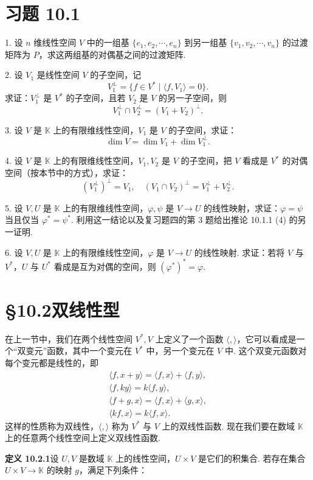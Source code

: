 \documentclass[UTF8,12pt,a4paper,fontset=fandol]{ctexart}
\begin{document}
\section*{习题 10.1}

1. 设 $n$ 维线性空间 $V$ 中的一组基 $\{e_1,e_2,\cdots,e_n\}$ 到另一组基 $\{v_1,v_2,\cdots,v_n\}$ 的过渡矩阵为 $P$，求这两组基的对偶基之间的过渡矩阵.

2. 设 $V_1$ 是线性空间 $V$ 的子空间，记
\[
  V_1^\perp=\{f\in V^*\mid \langle f,V_1\rangle=0\}.
\]
求证：$V_1^\perp$ 是 $V^*$ 的子空间，且若 $V_2$ 是 $V$ 的另一子空间，则
\[
  V_1^\perp\cap V_2^\perp=(V_1+V_2)^\perp.
\]

3. 设 $V$ 是 $\mathbb K$ 上的有限维线性空间，$V_1$ 是 $V$ 的子空间，求证：
\[
  \dim V=\dim V_1+\dim V_1^\perp.
\]

4. 设 $V$ 是 $\mathbb K$ 上的有限维线性空间，$V_1,V_2$ 是 $V$ 的子空间，把 $V$ 看成是 $V^*$ 的对偶空间（按本节中的方式），求证：
\[
  (V_1^\perp)^\perp=V_1,\quad (V_1\cap V_2)^\perp=V_1^\perp+V_2^\perp.
\]

5. 设 $V,U$ 是 $\mathbb K$ 上的有限维线性空间，$\varphi,\psi$ 是 $V\to U$ 的线性映射，求证：$\varphi=\psi$ 当且仅当 $\varphi^*=\psi^*$. 利用这一结论以及复习题四的第 3 题给出推论 10.1.1 (4) 的另一证明.

6. 设 $V,U$ 是 $\mathbb K$ 上的有限维线性空间，$\varphi$ 是 $V\to U$ 的线性映射. 求证：若将 $V$ 与 $V^*$，$U$ 与 $U^*$ 看成是互为对偶的空间，则 $(\varphi^*)^*=\varphi$.

\section*{§10.2\quad 双线性型}

在上一节中，我们在两个线性空间 $V^*,V$ 上定义了一个函数 $\langle,\rangle$，它可以看成是一个``双变元''函数，其中一个变元在 $V^*$ 中，另一个变元在 $V$ 中. 这个双变元函数对每个变元都是线性的，即
\[
\begin{gathered}
  \langle f,x+y\rangle=\langle f,x\rangle+\langle f,y\rangle,\\
  \langle f,ky\rangle=k\langle f,y\rangle,\\
  \langle f+g,x\rangle=\langle f,x\rangle+\langle g,x\rangle,\\
  \langle kf,x\rangle=k\langle f,x\rangle.
\end{gathered}
\]
这样的性质称为双线性，$\langle,\rangle$ 称为 $V^*$ 与 $V$ 上的双线性函数. 现在我们要在数域 $\mathbb K$ 上的任意两个线性空间上定义双线性函数.

\noindent\textbf{定义 10.2.1}\quad 设 $U,V$ 是数域 $\mathbb K$ 上的线性空间，$U\times V$ 是它们的积集合. 若存在集合 $U\times V\to\mathbb K$ 的映射 $g$，满足下列条件：
\end{document}
